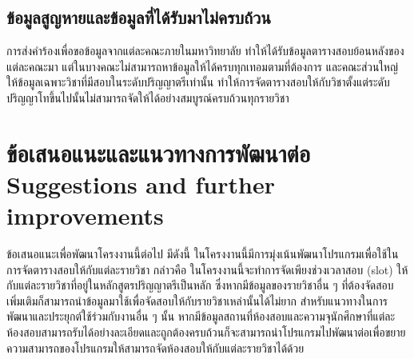 \subsection{ข้อมูลสูญหายและข้อมูลที่ได้รับมาไม่ครบถ้วน}
การส่งคำร้องเพื่อขอข้อมูลจากแต่ละคณะภายในมหาวิทยาลัย ทำให้ได้รับข้อมูลตารางสอบย้อนหลังของแต่ละคณะมา แต่ในบางคณะไม่สามารถหาข้อมูลให้ได้ครบทุกเทอมตามที่ต้องการ และคณะส่วนใหญ่ให้ข้อมูลเฉพาะวิชาที่มีสอบในระดับปริญญาตรีเท่านั้น
ทำให้การจัดตารางสอบให้กับวิชาตั้งแต่ระดับปริญญาโทขึ้นไปนั้นไม่สามารถจัดให้ได้อย่างสมบูรณ์ครบถ้วนทุกรายวิชา


\section{\ifcpe%
ข้อเสนอแนะและแนวทางการพัฒนาต่อ
\else%
Suggestions and further improvements
\fi
}

ข้อเสนอแนะเพื่อพัฒนาโครงงานนี้ต่อไป มีดังนี้
ในโครงงานนี้มีการมุ่งเน้นพัฒนาโปรแกรมเพื่อใช้ในการจัดตารางสอบให้กับแต่ละรายวิชา กล่าวคือ ในโครงงานนี้จะทำการจัดเพียงช่วงเวลาสอบ (slot) ให้กับแต่ละรายวิชาที่อยู่ในหลักสูตรปริญญาตรีเป็นหลัก ซึ่งหากมีข้อมูลของรายวิชาอื่น ๆ ที่ต้องจัดสอบเพิ่มเติมก็สามารถนำข้อมูลมาใช้เพื่อจัดสอบให้กับรายวิชาเหล่านั้นได้ไม่ยาก
สำหรับแนวทางในการพัฒนาและประยุกต์ใช้ร่วมกับงานอื่น ๆ นั้น หากมีข้อมูลสถานที่ห้องสอบและความจุนักศึกษาที่แต่ละห้องสอบสามารถรับได้อย่างละเอียดและถูกต้องครบถ้วนก็จะสามารถนำโปรแกรมไปพัฒนาต่อเพื่อขยายความสามารถของโปรแกรมให้สามารถจัดห้องสอบให้กับแต่ละรายวิชาได้ด้วย

